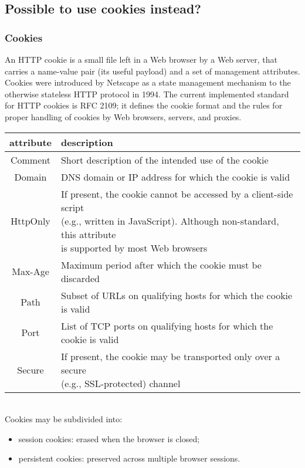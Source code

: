 \documentclass[a4paper, 10pt, titlepage]{article}
\begin{document}
\subsection{Possible to use cookies instead?}
\subsubsection{Cookies}
An HTTP cookie is a small file left in a Web browser by a Web server, that carries a name-value pair (its useful payload) and a set of management attributes. Cookies were introduced by Netscape as a state management mechanism to the otherwise stateless HTTP protocol in 1994. The current implemented standard for HTTP cookies is RFC 2109; it defines the cookie format and the rules for proper handling of cookies by Web browsers, servers, and proxies. \medskip\\
\begin{tabular}{|c|l|} \hline
\textbf{attribute} & \textbf{description} \\ \hline \hline
Comment & Short description of the intended use of the cookie \\ \hline
Domain & DNS domain or IP address for which the cookie is valid \\ \hline
HttpOnly & \thead{If present, the cookie cannot be accessed by a client-side script\\(e.g., written in JavaScript). Although non-standard, this attribute \\is supported by most Web browsers} \\ \hline
Max-Age & Maximum period after which the cookie must be discarded \\ \hline
Path & Subset of URLs on qualifying hosts for which the cookie is valid \\ \hline
Port & List of TCP ports on qualifying hosts for which the cookie is valid\\ \hline
Secure & \thead{If present, the cookie may be transported only over a secure \\(e.g., SSL-protected) channel} \\ \hline
\end{tabular} \medskip \\
Cookies may be subdivided into:
\begin{itemize}
\item session cookies: erased when the browser is closed;
\item persistent cookies: preserved across multiple browser sessions.
\end{itemize}
\end{document}
